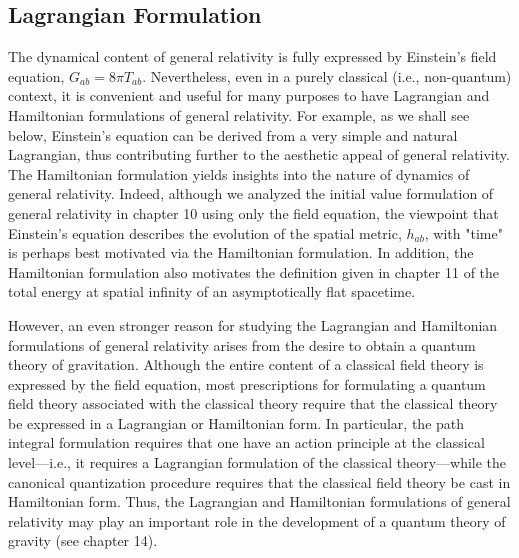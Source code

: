 
\subsection{Lagrangian Formulation}\label{sec:E.1}

The dynamical content of general relativity is fully expressed by Einstein's field
equation, \(G_{ab}=8\pi T_{ab}\). Nevertheless, even in a purely classical
(i.e., non-quantum) context, it is convenient and useful for many purposes to have
Lagrangian and Hamiltonian formulations of general relativity. For example, as we
shall see below, Einstein's equation can be derived from a very simple and natural
Lagrangian, thus contributing further to the aesthetic appeal of general relativity.
The Hamiltonian formulation yields insights into the nature of dynamics of general
relativity. Indeed, although we analyzed the initial value formulation of general
relativity in chapter 10 using only the field equation, the viewpoint that Einstein's
equation describes the evolution of the spatial metric, \(h_{ab}\), with "time" is
perhaps best motivated via the Hamiltonian formulation. In addition, the Hamiltonian
formulation also motivates the definition given in chapter 11 of the total energy at
spatial infinity of an asymptotically flat spacetime.

However, an even stronger reason for studying the Lagrangian and Hamiltonian
formulations of general relativity arises from the desire to obtain a quantum theory
of gravitation. Although the entire content of a classical field theory is expressed
by the field equation, most prescriptions for formulating a quantum field theory
associated with the classical theory require that the classical theory be expressed
in a Lagrangian or Hamiltonian form. In particular, the path integral formulation
requires that one have an action principle at the classical level---i.e., it requires
a Lagrangian formulation of the classical theory---while the canonical quantization
procedure requires that the classical field theory be cast in Hamiltonian form. Thus,
the Lagrangian and Hamiltonian formulations of general relativity may play an
important role in the development of a quantum theory of gravity (see chapter 14).

